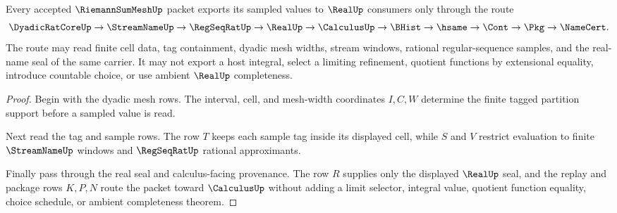 \begin{theorem}
\label{thm:riemann-sum-mesh-real-regseqrat-handoff}
Every accepted $\RiemannSumMeshUp$ packet exports its sampled values to $\RealUp$ consumers only through the route
$$
\DyadicRatCoreUp\to\StreamNameUp\to\RegSeqRatUp\to\RealUp\to\CalculusUp\to\BHist\to\hsame\to\Cont\to\Pkg\to\NameCert .
$$
The route may read finite cell data, tag containment, dyadic mesh widths, stream windows, rational regular-sequence samples, and the real-name seal of the same carrier. It may not export a host integral, select a limiting refinement, quotient functions by extensional equality, introduce countable choice, or use ambient $\RealUp$ completeness.
\end{theorem}
\begin{proof}
Begin with the dyadic mesh rows. The interval, cell, and mesh-width coordinates $I,C,W$ determine the finite tagged partition support before a sampled value is read.

Next read the tag and sample rows. The row $T$ keeps each sample tag inside its displayed cell, while $S$ and $V$ restrict evaluation to finite $\StreamNameUp$ windows and $\RegSeqRatUp$ rational approximants.

Finally pass through the real seal and calculus-facing provenance. The row $R$ supplies only the displayed $\RealUp$ seal, and the replay and package rows $K,P,N$ route the packet toward $\CalculusUp$ without adding a limit selector, integral value, quotient function equality, choice schedule, or ambient completeness theorem.
\end{proof}


\begin{closurestatus}{\RiemannSumMeshUp}
  \theoryclosure{\seedClosure}
  \formalstatus{\unformalizedV}
\end{closurestatus}
